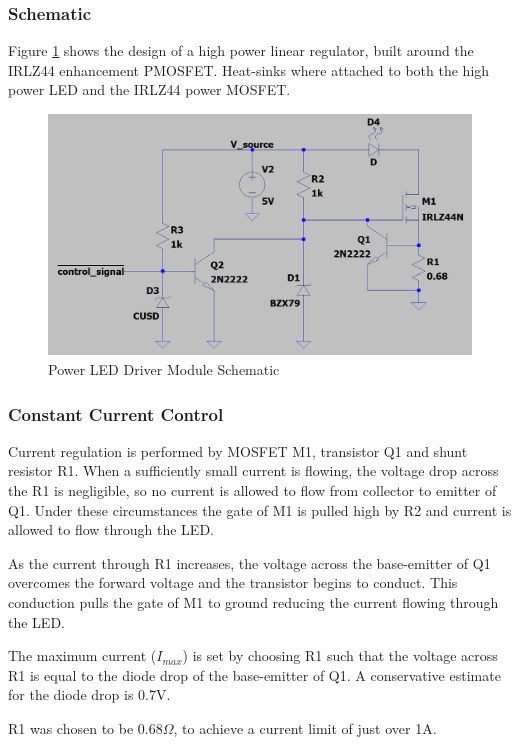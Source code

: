 \subsubsection{Schematic}
Figure \ref{fig:schematic_power_led_driver} shows the design of a high power linear regulator, built around the IRLZ44 enhancement PMOSFET. Heat-sinks where attached to both the high power LED and the IRLZ44 power MOSFET.

\begin{figure}[H]
	\centering
	\includegraphics[width=.8\textwidth]{figures/design/power_led_driver.JPG}
	\caption{Power LED Driver Module Schematic}
	\label{fig:schematic_power_led_driver}
\end{figure}

\subsubsection{Constant Current Control}

Current regulation is performed by MOSFET M1, transistor Q1 and shunt resistor R1. When a sufficiently small current is flowing, the voltage drop across the R1 is negligible, so no current is allowed to flow from collector to emitter of Q1. Under these circumstances the gate of M1 is pulled high by R2 and current is allowed to flow through the LED.

As the current through R1 increases, the voltage across the base-emitter of Q1 overcomes the forward voltage and the transistor begins to conduct. This conduction pulls the gate of M1 to ground reducing the current flowing through the LED.

The maximum current ($I_{max}$) is set by choosing R1 such that the voltage across R1 is equal to the diode drop of the base-emitter of Q1. A conservative estimate for the diode drop is 0.7V.

R1 was chosen to be $0.68\Omega$, to achieve a current limit of just over 1A.


